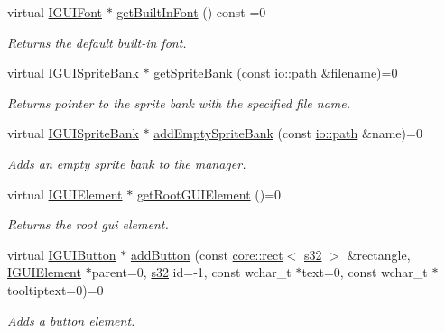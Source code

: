 \begin{DoxyCompactItemize}
virtual \hyperlink{classirr_1_1gui_1_1IGUIFont}{I\+G\+U\+I\+Font} $\ast$ \hyperlink{classirr_1_1gui_1_1IGUIEnvironment_a896fbfcbad5ccf187a835827b439da93}{get\+Built\+In\+Font} () const =0
\begin{DoxyCompactList}\small\item\em Returns the default built-\/in font. \end{DoxyCompactList}\item 
virtual \hyperlink{classirr_1_1gui_1_1IGUISpriteBank}{I\+G\+U\+I\+Sprite\+Bank} $\ast$ \hyperlink{classirr_1_1gui_1_1IGUIEnvironment_a187ebb28837dbdb88810f7e493096c3f}{get\+Sprite\+Bank} (const \hyperlink{namespaceirr_1_1io_a6468281622ce3a1c46b72e19f32dded5}{io\+::path} \&filename)=0
\begin{DoxyCompactList}\small\item\em Returns pointer to the sprite bank with the specified file name. \end{DoxyCompactList}\item 
virtual \hyperlink{classirr_1_1gui_1_1IGUISpriteBank}{I\+G\+U\+I\+Sprite\+Bank} $\ast$ \hyperlink{classirr_1_1gui_1_1IGUIEnvironment_a62f34cdf4dd600a35eaf37d856579d98}{add\+Empty\+Sprite\+Bank} (const \hyperlink{namespaceirr_1_1io_a6468281622ce3a1c46b72e19f32dded5}{io\+::path} \&name)=0
\begin{DoxyCompactList}\small\item\em Adds an empty sprite bank to the manager. \end{DoxyCompactList}\item 
virtual \hyperlink{classirr_1_1gui_1_1IGUIElement}{I\+G\+U\+I\+Element} $\ast$ \hyperlink{classirr_1_1gui_1_1IGUIEnvironment_a35fec6d5baa9b2f65aa9ee2c336104d4}{get\+Root\+G\+U\+I\+Element} ()=0
\begin{DoxyCompactList}\small\item\em Returns the root gui element. \end{DoxyCompactList}\item 
virtual \hyperlink{classirr_1_1gui_1_1IGUIButton}{I\+G\+U\+I\+Button} $\ast$ \hyperlink{classirr_1_1gui_1_1IGUIEnvironment_a666749b7352a677c74acb242199e54a0}{add\+Button} (const \hyperlink{classirr_1_1core_1_1rect}{core\+::rect}$<$ \hyperlink{namespaceirr_ac66849b7a6ed16e30ebede579f9b47c6}{s32} $>$ \&rectangle, \hyperlink{classirr_1_1gui_1_1IGUIElement}{I\+G\+U\+I\+Element} $\ast$parent=0, \hyperlink{namespaceirr_ac66849b7a6ed16e30ebede579f9b47c6}{s32} id=-\/1, const wchar\+\_\+t $\ast$text=0, const wchar\+\_\+t $\ast$tooltiptext=0)=0
\begin{DoxyCompactList}\small\item\em Adds a button element. \end{DoxyCompactList}\item 

\end{DoxyCompactItemize}
